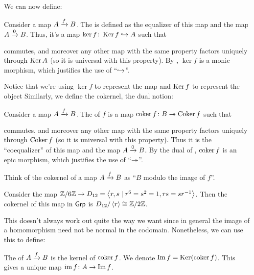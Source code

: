 We can now define:
\begin{definition}
	Consider a map $A \xrightarrow{f} B$.
	The  is defined as the equalizer of this map and the map $A \xrightarrow{0} B$.
	Thus, it's a map $\ker f \colon \operatorname{Ker} f \hookrightarrow A$ such that
	\begin{center}
	\end{center}
	commutes, and moreover any other map with the same property factors uniquely through $\operatorname{Ker} A$
	(so it is universal with this property).
	By , $\ker f$ is a monic morphism,
	which justifies the use of ``$\hookrightarrow$''.
\end{definition}
Notice that we're using $\ker f$ to represent the map and $\operatorname{Ker} f$ to represent the object
Similarly, we define the cokernel, the dual notion:
\begin{definition}
	Consider a map $A \xrightarrow{f} B$.
	The  of $f$ is a map $\operatorname{coker} f \colon B \twoheadrightarrow \operatorname{Coker} f$ such that
	\begin{center}
	\end{center}
	commutes, and moreover any other map with the same property factors
	uniquely through $\operatorname{Coker} f$ (so it is universal with this property).
	Thus it is the ``coequalizer'' of this map and the map $A \xrightarrow{0} B$.
	By the dual of , $\operatorname{coker} f$ is an epic morphism,
	which justifies the use of ``$\twoheadrightarrow$''.
\end{definition}
Think of the cokernel of a map $A \xrightarrow{f} B$ as ``$B$ modulo the image of $f$''.
\begin{example}
	[Cokernels]
	Consider the map $\mathbb Z/6\mathbb Z \to D_{12} = \left\langle r,s \mid r^6=s^2=1, rs=sr^{-1}\right\rangle$.
	Then the cokernel of this map in $\mathsf{Grp}$ is $D_{12} / \left\langle r \right\rangle \cong \mathbb Z/2\mathbb Z$.
\end{example}
This doesn't always work out quite the way we want since in general the image of
a homomorphism need not be normal in the codomain.
Nonetheless, we can use this to define:
\begin{definition}
	The  of $A \xrightarrow{f} B$ is the kernel of $\operatorname{coker} f$.
	We denote $\operatorname{Im} f = \operatorname{Ker}(\operatorname{coker} f)$.
	This gives a unique map $\operatorname{im} f \colon A \to \operatorname{Im} f$.
\end{definition}

